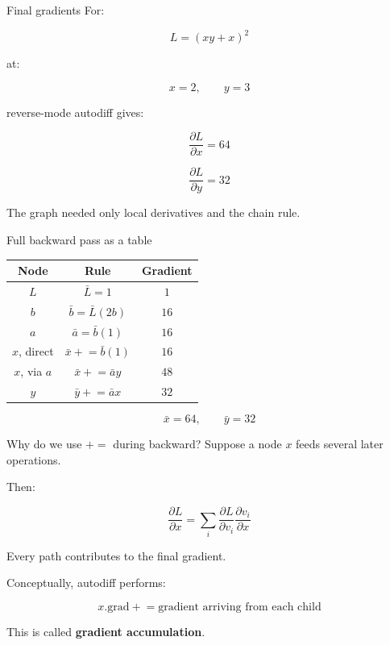 \documentclass[10pt,aspectratio=169]{beamer}
\newcommand{\grad}[2]{\frac{\partial #1}{\partial #2}}
\newcommand{\adj}[1]{\bar{#1}}
\begin{document}
\begin{frame}[t]{Final gradients}
For:

\[
L=(xy+x)^2
\]

at:

\[
x=2,\qquad y=3
\]

reverse-mode autodiff gives:

\[
\boxed{\grad{L}{x}=64}
\]

\[
\boxed{\grad{L}{y}=32}
\]

\vfill

The graph needed only local derivatives and the chain rule.
\end{frame}

\begin{frame}[t]{Full backward pass as a table}
\centering
\small

\begin{tabular}{c c c}
\toprule
Node & Rule & Gradient \\
\midrule
\(L\) & \(\adj{L}=1\) & \(1\) \\
\(b\) & \(\adj{b}=\adj{L}(2b)\) & \(16\) \\
\(a\) & \(\adj{a}=\adj{b}(1)\) & \(16\) \\
\(x\), direct & \(\adj{x}\mathrel{+}=\adj{b}(1)\) & \(16\) \\
\(x\), via \(a\) & \(\adj{x}\mathrel{+}=\adj{a}y\) & \(48\) \\
\(y\) & \(\adj{y}\mathrel{+}=\adj{a}x\) & \(32\) \\
\bottomrule
\end{tabular}

\vspace{0.35cm}

\[
\boxed{
\adj{x}=64,\qquad
\adj{y}=32
}
\]
\end{frame}

\begin{frame}[t]{Why do we use \(+=\) during backward?}
Suppose a node \(x\) feeds several later operations.

Then:

\[
\grad{L}{x}
=
\sum_i
\grad{L}{v_i}
\grad{v_i}{x}
\]

Every path contributes to the final gradient.

Conceptually, autodiff performs:

\[
\boxed{
x.\text{grad}
\mathrel{+}=
\text{gradient arriving from each child}
}
\]

This is called \textbf{gradient accumulation}.
\end{frame}
\end{document}
